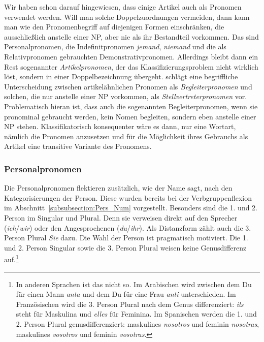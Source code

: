 Wir haben schon darauf hingewiesen, dass einige Artikel auch als Pronomen verwendet werden. Will man solche Doppelzuordnungen vermeiden, dann kann man \zB wie \citet[182]{Eisenberg2020_Satz} den Pronomenbegriff auf diejenigen Formen einschränken, die ausschließlich anstelle einer NP, aber nie als ihr Bestandteil vorkommen. Das sind Personalpronomen, die Indefinitpronomen \textit{jemand}, \textit{niemand} und die als Relativpronomen gebrauchten Demonstrativpronomen. Allerdings bleibt dann ein Rest sogenannter \textit{Artikelpronomen}, der das Klassifizierungsproblem nicht wirklich löst, sondern in einer Doppelbezeichnung übergeht. \citet[85, 88]{Imo2016} schlägt eine begriffliche Unterscheidung zwischen artikelähnlichen Pronomen als \textit{Begleiterpronomen} und solchen, die nur anstelle einer NP vorkommen, als \textit{Stellvertreterpronomen} vor. Problematisch hieran ist, dass auch die sogenannten Begleiterpronomen, wenn sie pronominal gebraucht werden, kein Nomen begleiten, sondern eben anstelle einer NP stehen. Klassifikatorisch konsequenter wäre es dann, nur eine Wortart, nämlich die Pronomen anzusetzen und für die Möglichkeit ihres Gebrauchs als Artikel eine transitive Variante des Pronomens. 

\subsubsection{Personalpronomen}\label{subsubsection:Personalpronomen}
\largerpage

Die Personalpronomen flektieren zusätzlich, wie der Name sagt, nach den Kategorisierungen der Person. Diese wurden bereits bei der Verbgruppenflexion im Abschnitt~\ref{subsubsection:Pers_Num} vorgestellt. Besonders sind die 1. und 2. Person im Singular und Plural. Denn sie verweisen direkt auf den Sprecher (\textit{ich}/\textit{wir}) oder den Angesprochenen (\textit{du}/\textit{ihr}). Als Distanzform zählt auch die 3. Person Plural \textit{Sie} dazu. Die Wahl der Person ist pragmatisch motiviert. Die 1. und 2. Person Singular sowie die 3. Person Plural weisen keine Genusdifferenz auf.\footnote{In anderen Sprachen ist das nicht so. Im Arabischen wird zwischen dem Du für einen Mann \textit{anta} und dem Du für eine Frau \textit{anti} unterschieden. Im Französischen wird die 3. Person Plural nach dem Genus differenziert: \textit{ils} steht für Maskulina und \textit{elles} für Feminina. Im Spanischen werden die 1. und 2. Person Plural genusdifferenziert: maskulines  \textit{nosotros} und feminin \textit{nosotras}, maskulines  \textit{vosotros} und feminin \textit{vosotras}.}

